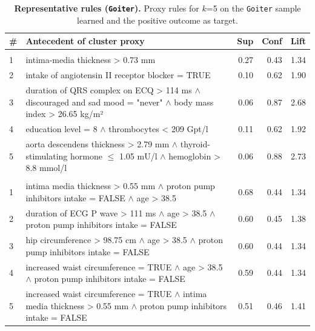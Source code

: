 \documentclass[
  oneside]{book}
\begin{document}
\begin{table}

\caption{\label{tab:04-findings-goiter}\textbf{Representative rules (\texttt{Goiter}).} Proxy rules for \(k\)=5 on the \texttt{Goiter} sample learned and the positive outcome as target.}
\centering
\begin{tabular}[t]{l>{\raggedright\arraybackslash}p{10cm}rrr}
\toprule
\textbf{\#} & \textbf{Antecedent of cluster proxy} & \textbf{Sup} & \textbf{Conf} & \textbf{Lift}\\
\midrule
\addlinespace[0.3em]
\multicolumn{5}{l}{\textbf{HotSpot}}\\
\hspace{1em}1 & intima-media thickness > 0.73 mm & 0.27 & 0.43 & 1.34\\
\hspace{1em}2 & intake of angiotensin II receptor blocker = TRUE & 0.10 & 0.62 & 1.90\\
\hspace{1em}3 & duration of QRS complex on ECQ > 114 ms $\wedge$ discouraged and sad mood = "never" $\wedge$ body mass index > 26.65 kg/m² & 0.06 & 0.87 & 2.68\\
\hspace{1em}4 & education level = 8 $\wedge$ thrombocytes < 209 Gpt/l & 0.11 & 0.62 & 1.92\\
\hspace{1em}5 & aorta descendens thickness > 2.79 mm $\wedge$ thyroid-stimulating hormone $\leq$ 1.05 mU/l $\wedge$ hemoglobin > 8.8 mmol/l & 0.06 & 0.88 & 2.73\\
\addlinespace[0.3em]
\multicolumn{5}{l}{\textbf{SD-Map}}\\
\hspace{1em}1 & intima media thickness > 0.55 mm $\wedge$ proton pump inhibitors intake = FALSE $\wedge$ age > 38.5 & 0.68 & 0.44 & 1.34\\
\hspace{1em}2 & duration of ECG P wave > 111 ms $\wedge$ age > 38.5 $\wedge$ proton pump inhibitors intake = FALSE & 0.60 & 0.45 & 1.38\\
\hspace{1em}3 & hip circumference > 98.75 cm $\wedge$ age > 38.5 $\wedge$ proton pump inhibitors intake = FALSE & 0.60 & 0.44 & 1.34\\
\hspace{1em}4 & increased waist circumference = TRUE $\wedge$ age > 38.5 $\wedge$ proton pump inhibitors intake = FALSE & 0.59 & 0.44 & 1.34\\
\hspace{1em}5 & increased waist circumference = TRUE $\wedge$ intima media thickness > 0.55 mm $\wedge$ proton pump inhibitors intake = FALSE & 0.51 & 0.46 & 1.41\\
\bottomrule
\end{tabular}
\end{table}
\end{document}
